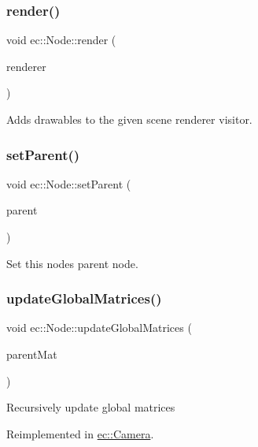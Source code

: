 \subsubsection{\texorpdfstring{render()}{render()}}
{\footnotesize\ttfamily void ec\+::\+Node\+::render (\begin{DoxyParamCaption}\item[{\mbox{\hyperlink{classec_1_1_scene_renderer}{Scene\+Renderer}} \&}]{renderer }\end{DoxyParamCaption})\hspace{0.3cm}{\ttfamily [virtual]}}

Adds drawables to the given scene renderer visitor. \mbox{\label{classec_1_1_node_a3c908e5f01e989cedfba5dc1a3ed66c1}} 
\subsubsection{\texorpdfstring{set\+Parent()}{setParent()}}
{\footnotesize\ttfamily void ec\+::\+Node\+::set\+Parent (\begin{DoxyParamCaption}\item[{\mbox{\hyperlink{classec_1_1_node}{Node}} $\ast$}]{parent }\end{DoxyParamCaption})}

Set this node\textquotesingle{}s parent node. \mbox{\label{classec_1_1_node_a12a9b14ccc434c52404e262ef5db6f80}} 
\subsubsection{\texorpdfstring{update\+Global\+Matrices()}{updateGlobalMatrices()}}
{\footnotesize\ttfamily void ec\+::\+Node\+::update\+Global\+Matrices (\begin{DoxyParamCaption}\item[{const glm\+::mat4 \&}]{parent\+Mat }\end{DoxyParamCaption})\hspace{0.3cm}{\ttfamily [virtual]}}

Recursively update global matrices 

Reimplemented in \mbox{\hyperlink{classec_1_1_camera_a1661dae4666cf50e697603904c96df6a}{ec\+::\+Camera}}.



